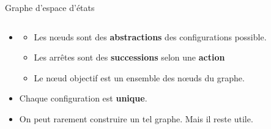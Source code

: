 \documentclass{beamer}
\begin{document}
\begin{frame}[t]{Graphe d'espace d'états}
  
  \begin{columns}
    \begin{column}{0.4\textwidth}
      \begin{itemize}
        \small
      \item<2->  
        \begin{itemize}
          \scriptsize
        \item<3-> Les \alert{nœuds} sont des \textbf{abstractions} des
          configurations possible.
        \item<4-> Les \alert{arrêtes} sont des \textbf{successions}
          selon une \textbf{action} 
        \item<5-> Le nœud \alert{objectif} est un ensemble des nœuds
          du graphe.
        \end{itemize}
      \item<6-> Chaque configuration est \textbf{\alert{unique}}. 
      \item<7-> On peut \alert{rarement} construire un tel graphe. Mais il
        reste utile.
      \end{itemize}
    \end{column}
    \begin{column}{0.6\textwidth}
\end{column}
\end{columns}
\end{frame}
\end{document}
